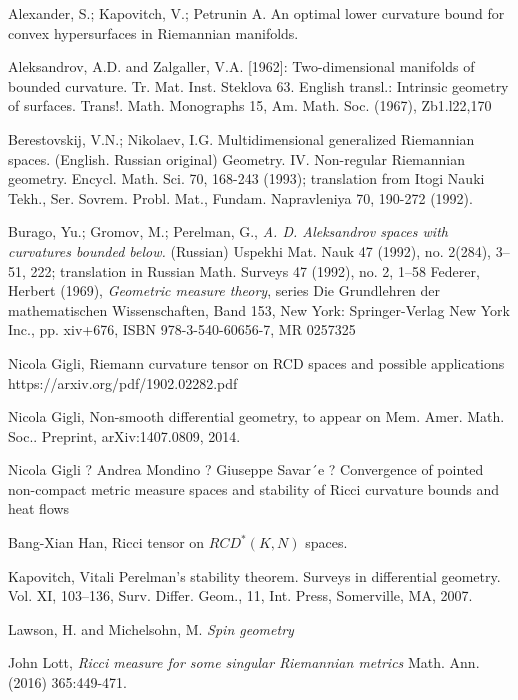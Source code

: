 \begin{thebibliography}{52}

 Alexander, S.; Kapovitch, V.; Petrunin A.
An optimal lower curvature bound for convex hypersurfaces in Riemannian manifolds.


Aleksandrov, A.D. and Zalgaller, V.A. [1962]: Two-dimensional manifolds of bounded curvature.
Tr. Mat. Inst. Steklova 63. English transl.: Intrinsic geometry of surfaces. Trans!. Math. Monographs
15, Am. Math. Soc. (1967), Zb1.l22,170


Berestovskij, V.N.; Nikolaev, I.G.
Multidimensional generalized Riemannian spaces. (English. Russian original)
Geometry. IV. Non-regular Riemannian geometry. Encycl. Math. Sci. 70, 168-243 (1993); translation from Itogi Nauki Tekh., Ser. Sovrem. Probl. Mat., Fundam. Napravleniya 70, 190-272 (1992).


 Burago, Yu.; Gromov, M.; Perelman, G., \textit{A. D. Aleksandrov spaces
with curvatures bounded below.} (Russian)  Uspekhi Mat. Nauk  47  (1992),  no.
2(284), 3--51, 222;   translation in  Russian Math. Surveys  47  (1992),  no. 2, 1--58
Federer, Herbert (1969), \textit{Geometric measure theory}, series Die Grundlehren der mathematischen Wissenschaften, Band 153, New York: Springer-Verlag New York Inc., pp. xiv+676, ISBN 978-3-540-60656-7, MR 0257325

Nicola Gigli,
Riemann curvature tensor on RCD spaces and possible applications https://arxiv.org/pdf/1902.02282.pdf

Nicola Gigli,
Non-smooth differential geometry, to appear on Mem. Amer. Math. Soc..
Preprint, arXiv:1407.0809, 2014.

Nicola Gigli ? Andrea Mondino ? Giuseppe Savar´e ?
Convergence of pointed non-compact metric measure spaces
and stability of Ricci curvature bounds and heat flows



 Bang-Xian Han, 
Ricci tensor on $RCD^*(K, N)$ spaces.

 Kapovitch, Vitali Perelman's stability theorem. Surveys in differential geometry. Vol. XI, 103–136, Surv. Differ. Geom., 11, Int. Press, Somerville, MA, 2007.

Lawson, H. and Michelsohn, M.
\textit{Spin geometry}

 John Lott,\textit{
Ricci measure for some singular Riemannian metrics}
Math. Ann. (2016) 365:449-471.


\end{thebibliography}
